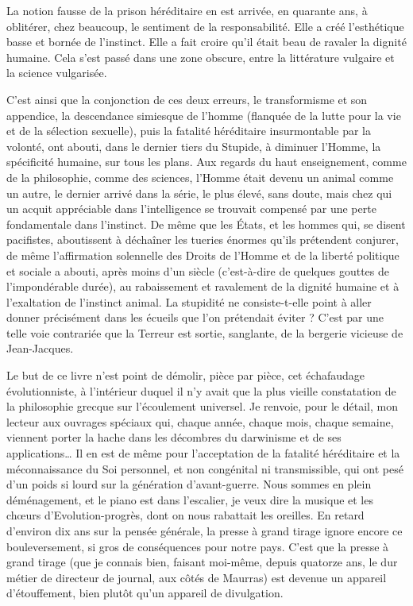 \documentclass[french,twoside]{book} %
\begin{document}
La notion fausse de la prison héréditaire en est arrivée, en quarante ans, à oblitérer, chez beaucoup, le sentiment de la responsabilité. Elle a créé l’esthétique basse et bornée de l’instinct. Elle a fait croire qu’il était beau de ravaler la dignité humaine. Cela s’est passé dans une zone obscure, entre la littérature vulgaire et la science vulgarisée.\par
C’est ainsi que la conjonction de ces deux erreurs, le transformisme et son appendice, la descendance simiesque de l’homme (flanquée de la lutte pour la vie et de la sélection sexuelle), puis la fatalité héréditaire insurmontable par la volonté, ont abouti, dans le dernier tiers du Stupide, à diminuer l’Homme, la spécificité humaine, sur tous les plans. Aux regards du haut enseignement, comme de la philosophie, comme des sciences, l’Homme était devenu un animal comme un autre, le dernier arrivé dans la série, le plus élevé, sans doute, mais chez qui un acquit appréciable dans l’intelligence se trouvait compensé par une perte fondamentale dans l’instinct. De même que les États, et les hommes qui, se disent pacifistes, aboutissent à déchaîner les tueries énormes qu’ils prétendent conjurer, de même l’affirmation solennelle des Droits de l’Homme et de la liberté politique et sociale a abouti, après moins d’un siècle (c’est-à-dire de quelques gouttes de l’impondérable durée), au rabaissement et ravalement de la dignité humaine et à l’exaltation de l’instinct animal. La stupidité ne consiste-t-elle point à aller donner précisément dans les écueils que l’on prétendait éviter ? C’est par une telle voie contrariée que la Terreur est sortie, sanglante, de la bergerie vicieuse de Jean-Jacques.\par
Le but de ce livre n’est point de démolir, pièce par pièce, cet échafaudage évolutionniste, à l’intérieur duquel il n’y avait que la plus vieille constatation de la philosophie grecque sur l’écoulement universel. Je renvoie, pour le détail, mon lecteur aux ouvrages spéciaux qui, chaque année, chaque mois, chaque semaine, viennent porter la hache dans les décombres du darwinisme et de ses applications… Il en est de même pour l’acceptation de la fatalité héréditaire et la méconnaissance du Soi personnel, et non congénital ni transmissible, qui ont pesé d’un poids si lourd sur la génération d’avant-guerre. Nous sommes en plein déménagement, et le piano est dans l’escalier, je veux dire la musique et les chœurs d’Evolution-progrès, dont on nous rabattait les oreilles. En retard d’environ dix ans sur la pensée générale, la presse à grand tirage ignore encore ce bouleversement, si gros de conséquences pour notre pays. C’est que la presse à grand tirage (que je connais bien, faisant moi-même, depuis quatorze ans, le dur métier de directeur de journal, aux côtés de Maurras) est devenue un appareil d’étouffement, bien plutôt qu’un appareil de divulgation.\par
\end{document}
